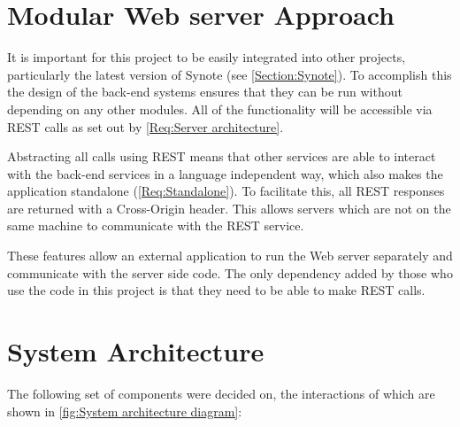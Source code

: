 \section{Modular Web server Approach}
\label{Section:Modular Approach}

It is important for this project to be easily integrated into other projects, particularly the latest version of Synote (see \autoref{Section:Synote}). To accomplish this the design of the back-end systems ensures that they can be run without depending on any other modules. All of the functionality will be accessible via \gls{REST} calls as set out by \cref{Req:Server architecture}.

Abstracting all calls using \gls{REST} means that other services are able to interact with the back-end services in a language independent way, which also makes the application standalone (\cref{Req:Standalone}). To facilitate this, all \gls{REST} responses are returned with a Cross-Origin header. This allows servers which are not on the same machine to communicate with the \gls{REST} service.

These features allow an external application to run the Web server separately and communicate with the server side code. The only dependency added by those who use the code in this project is that they need to be able to make \gls{REST} calls.

\section{System Architecture}

The following set of components were decided on, the interactions of which are shown in \autoref{fig:System architecture diagram}:

